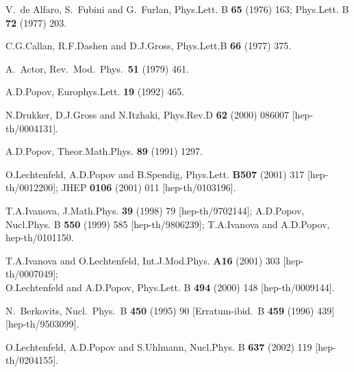 \documentclass[a4paper,11pt]{article}
\numberwithin{equation}{section}
\begin{document}
\begin{thebibliography}{99}
V.~de Alfaro, S.~Fubini and G.~Furlan,
Phys.Lett. B {\bf 65} (1976) 163;
Phys.Lett. B {\bf 72} (1977) 203.

C.G.Callan, R.F.Dashen and D.J.Gross,
Phys.Lett.B {\bf 66} (1977) 375.

A.~Actor,
Rev.\ Mod.\ Phys.\  {\bf 51} (1979) 461.

A.D.Popov,
Europhys.Lett. {\bf 19} (1992) 465.

N.Drukker, D.J.Gross and N.Itzhaki,
Phys.Rev.D {\bf 62} (2000) 086007
[hep-th/0004131].

A.D.Popov,
Theor.Math.Phys.  {\bf 89} (1991) 1297.

O.Lechtenfeld, A.D.Popov and B.Spendig,
Phys.Lett. {\bf B507} (2001) 317  [hep-th/0012200];
JHEP {\bf 0106} (2001) 011 [hep-th/0103196].

T.A.Ivanova, 
J.Math.Phys. {\bf 39} (1998) 79 [hep-th/9702144];
A.D.Popov,
Nucl.Phys. B {\bf 550} (1999) 585
[hep-th/9806239];
T.A.Ivanova and A.D.Popov,
hep-th/0101150.

T.A.Ivanova and O.Lechtenfeld,
Int.J.Mod.Phys. {\bf A16} (2001) 303  [hep-th/0007049];
\\
O.Lechtenfeld and A.D.Popov,
Phys.Lett. B {\bf 494} (2000) 148
[hep-th/0009144].


N.~Berkovits,
Nucl.\ Phys.\ B {\bf 450} (1995) 90
[Erratum-ibid.\ B {\bf 459} (1996) 439]
[hep-th/9503099].



O.Lechtenfeld, A.D.Popov and S.Uhlmann,
Nucl.Phys. B {\bf 637} (2002) 119
[hep-th/0204155].

\end{thebibliography}
\end{document}
